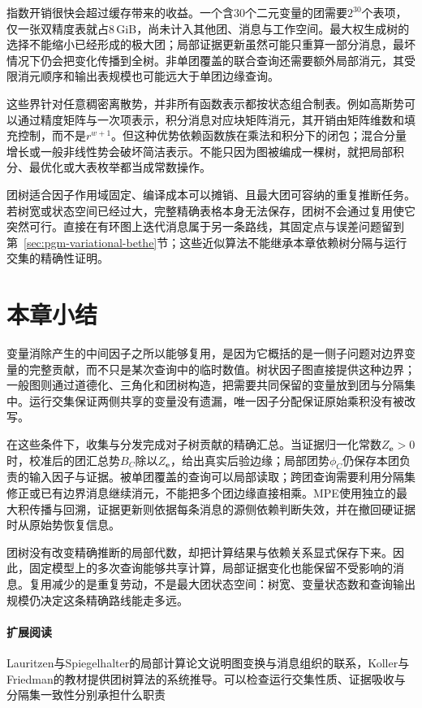 指数开销很快会超过缓存带来的收益。一个含$30$个二元变量的团需要$2^{30}$个表项，仅一张双精度表就占$8$\,GiB，尚未计入其他团、消息与工作空间。最大权生成树的选择不能缩小已经形成的极大团；局部证据更新虽然可能只重算一部分消息，最坏情况下仍会把变化传播到全树。非单团覆盖的联合查询还需要额外局部消元，其受限消元顺序和输出表规模也可能远大于单团边缘查询。

这些界针对任意稠密离散势，并非所有函数表示都按状态组合制表。例如高斯势可以通过精度矩阵与一次项表示，积分消息对应块矩阵消元，其开销由矩阵维数和填充控制，而不是$r^{w+1}$。但这种优势依赖函数族在乘法和积分下的闭包；混合分量增长或一般非线性势会破坏简洁表示。不能只因为图被编成一棵树，就把局部积分、最优化或大表枚举都当成常数操作。

团树适合因子作用域固定、编译成本可以摊销、且最大团可容纳的重复推断任务。若树宽或状态空间已经过大，完整精确表格本身无法保存，团树不会通过复用使它突然可行。直接在有环图上迭代消息属于另一条路线，其固定点与误差问题留到第~\ref{sec:pgm-variational-bethe}节；这些近似算法不能继承本章依赖树分隔与运行交集的精确性证明。

\section{本章小结}
\label{sec:pgm-junction-tree-summary}

变量消除产生的中间因子之所以能够复用，是因为它概括的是一侧子问题对边界变量的完整贡献，而不只是某次查询中的临时数值。树状因子图直接提供这种边界；一般图则通过道德化、三角化和团树构造，把需要共同保留的变量放到团与分隔集中。运行交集保证两侧共享的变量没有遗漏，唯一因子分配保证原始乘积没有被改写。

在这些条件下，收集与分发完成对子树贡献的精确汇总。当证据归一化常数$Z_{\bm e}>0$时，校准后的团汇总势$B_C$除以$Z_{\bm e}$，给出真实后验边缘；局部团势$\phi_C$仍保存本团负责的输入因子与证据。被单团覆盖的查询可以局部读取；跨团查询需要利用分隔集修正或已有边界消息继续消元，不能把多个团边缘直接相乘。MPE使用独立的最大积传播与回溯，证据更新则依据每条消息的源侧依赖判断失效，并在撤回硬证据时从原始势恢复信息。

团树没有改变精确推断的局部代数，却把计算结果与依赖关系显式保存下来。因此，固定模型上的多次查询能够共享计算，局部证据变化也能保留不受影响的消息。复用减少的是重复劳动，不是最大团状态空间：树宽、变量状态数和查询输出规模仍决定这条精确路线能走多远。

\paragraph{扩展阅读}
Lauritzen与Spiegelhalter的局部计算论文说明图变换与消息组织的联系，Koller与Friedman的教材提供团树算法的系统推导。可以检查运行交集性质、证据吸收与分隔集一致性分别承担什么职责
